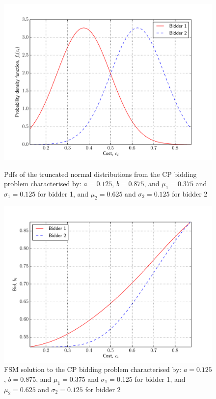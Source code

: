\begin{figure}[p!]
  \includegraphics[width=\figsize]{Approximation/Figures/test_truncated_normal_pdfs}
  \caption{Pdfs of the truncated normal distributions from the CP bidding problem characterised by: $a=0.125$, $b=0.875$, and $\mu_1=0.375$ and $\sigma_1=0.125$ for bidder 1, and $\mu_2=0.625$ and $\sigma_2=0.125$ for bidder 2}
  \label{fig:test_truncated_normal_pdfs_approximation}
  \vspace{10mm}
  \includegraphics[width=\figsize]{Approximation/Figures/test_truncated_normal_bids}
  \caption{FSM solution to the CP bidding problem characterised by: $a=0.125$, $b=0.875$, and $\mu_1=0.375$ and $\sigma_1=0.125$ for bidder 1, and $\mu_2=0.625$ and $\sigma_2=0.125$ for bidder 2}
  \label{fig:test_truncated_normal_bids_approximation}
\end{figure}

